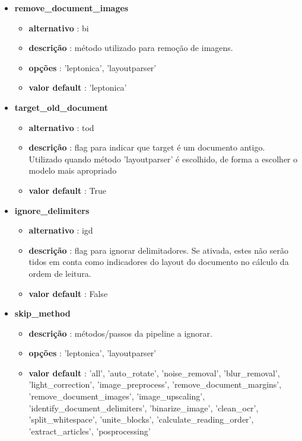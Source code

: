 \begin{itemize}
	\item \textbf{remove\_document\_images}
		\begin{itemize}\setlength\itemsep{-0.5em}
			\item \textbf{alternativo} : bi
			\item \textbf{descrição} : método utilizado para remoção de imagens.
			\item \textbf{opções} : 'leptonica', 'layoutparser'
			\item \textbf{valor default} : 'leptonica'
		\end{itemize}
	
	\item \textbf{target\_old\_document}
		\begin{itemize}\setlength\itemsep{-0.5em}
			\item \textbf{alternativo} : tod
			\item \textbf{descrição} : flag para indicar que target é um documento antigo. Utilizado quando método 'layoutparser' é escolhido, de forma a escolher o modelo mais apropriado
			\item \textbf{valor default} : True
		\end{itemize}
	
	\item \textbf{ignore\_delimiters}
		\begin{itemize}\setlength\itemsep{-0.5em}
			\item \textbf{alternativo} : igd
			\item \textbf{descrição} : flag para ignorar delimitadores. Se ativada, estes não serão tidos em conta como indicadores do layout do documento no cálculo da ordem de leitura.
			\item \textbf{valor default} : False
		\end{itemize}
	
	\item \textbf{skip\_method}
		\begin{itemize}\setlength\itemsep{-0.5em}
			\item \textbf{descrição} : métodos/passos da pipeline a ignorar.
			\item \textbf{opções} : 'leptonica', 'layoutparser'
			\item \textbf{valor default} : 'all', 'auto\_rotate', 'noise\_removal', 'blur\_removal', 'light\_correction', 'image\_preprocess', 'remove\_document\_margins', 'remove\_document\_images', 'image\_upscaling', 'identify\_document\_delimiters', 'binarize\_image', 'clean\_ocr', 'split\_whitespace', 'unite\_blocks', 'calculate\_reading\_order', 'extract\_articles', 'posprocessing'
		\end{itemize}
	

\end{itemize}
